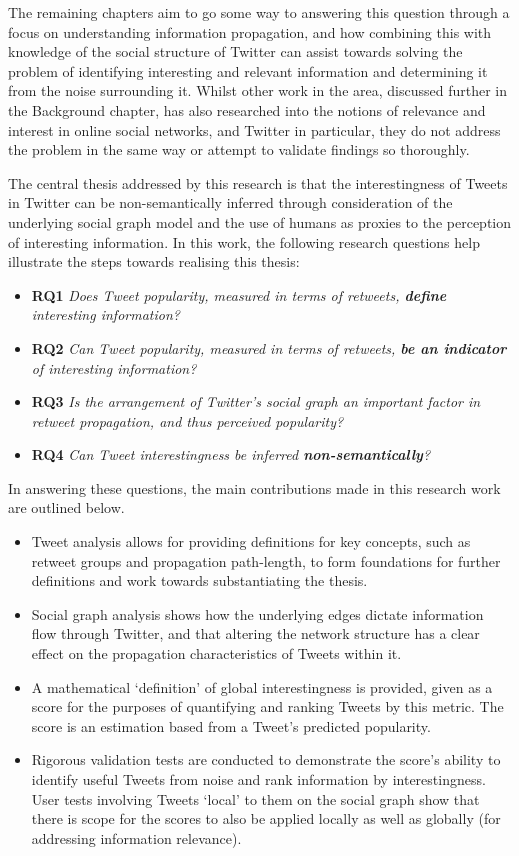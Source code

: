 The remaining chapters aim to go some way to answering this question through a focus on understanding information propagation, and how combining this with knowledge of the social structure of Twitter can assist towards solving the problem of identifying interesting and relevant information and determining it from the noise surrounding it. Whilst other work in the area, discussed further in the Background chapter, has also researched into the notions of relevance and interest in online social networks, and Twitter in particular, they do not address the problem in the same way or attempt to validate findings so thoroughly.

The central thesis addressed by this research is that the interestingness of Tweets in Twitter can be non-semantically inferred through consideration of the underlying social graph model and the use of humans as proxies to the perception of interesting information. In this work, the following research questions help illustrate the steps towards realising this thesis: 
\begin{itemize}
    \item \textbf{RQ1} \textit{Does Tweet popularity, measured in terms of retweets, \textbf{define} interesting information?}
    \item \textbf{RQ2} \textit{Can Tweet popularity, measured in terms of retweets, \textbf{be an indicator} of interesting information?}
    \item \textbf{RQ3} \textit{Is the arrangement of Twitter's social graph an important factor in retweet propagation, and thus perceived popularity?}
    \item \textbf{RQ4} \textit{Can Tweet interestingness be inferred \textbf{non-semantically}?}
\end{itemize} 

In answering these questions, the main contributions made in this research work are outlined below.
\begin{itemize}
    \item Tweet analysis allows for providing definitions for key concepts, such as retweet groups and propagation path-length, to form foundations for further definitions and work towards substantiating the thesis.
    \item Social graph analysis shows how the underlying edges dictate information flow through Twitter, and that altering the network structure has a clear effect on the propagation characteristics of Tweets within it.
    \item A mathematical `definition' of global interestingness is provided, given as a score for the purposes of quantifying and ranking Tweets by this metric. The score is an estimation based from a Tweet's predicted popularity.
    \item Rigorous validation tests are conducted to demonstrate the score's ability to identify useful Tweets from noise and rank information by interestingness. User tests involving Tweets `local' to them on the social graph show that there is scope for the scores to also be applied locally as well as globally (for addressing information relevance). 
\end{itemize}


